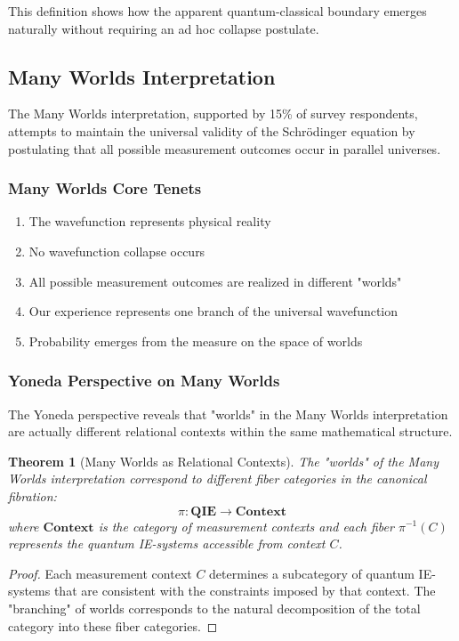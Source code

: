 \documentclass[12pt,a4paper]{article}
\newtheorem{theorem}{Theorem}[section]
\begin{document}
This definition shows how the apparent quantum-classical boundary emerges naturally without requiring an ad hoc collapse postulate.

\subsection{Many Worlds Interpretation}

The Many Worlds interpretation, supported by 15\% of survey respondents, attempts to maintain the universal validity of the Schrödinger equation by postulating that all possible measurement outcomes occur in parallel universes.

\subsubsection{Many Worlds Core Tenets}
\begin{enumerate}
\item The wavefunction represents physical reality
\item No wavefunction collapse occurs
\item All possible measurement outcomes are realized in different "worlds"
\item Our experience represents one branch of the universal wavefunction
\item Probability emerges from the measure on the space of worlds
\end{enumerate}

\subsubsection{Yoneda Perspective on Many Worlds}

The Yoneda perspective reveals that "worlds" in the Many Worlds interpretation are actually different relational contexts within the same mathematical structure.

\begin{theorem}[Many Worlds as Relational Contexts]
The "worlds" of the Many Worlds interpretation correspond to different fiber categories in the canonical fibration:
\[
\pi: \mathbf{QIE} \to \mathbf{Context}
\]
where $\mathbf{Context}$ is the category of measurement contexts and each fiber $\pi^{-1}(C)$ represents the quantum IE-systems accessible from context $C$.
\end{theorem}

\begin{proof}
Each measurement context $C$ determines a subcategory of quantum IE-systems that are consistent with the constraints imposed by that context. The "branching" of worlds corresponds to the natural decomposition of the total category into these fiber categories.
\end{proof}
\end{document}
